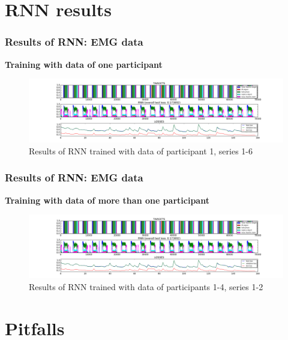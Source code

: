 \documentclass{beamer}
\begin{document}
\section{RNN results}		

\begin{frame}
	\frametitle{Results of RNN: EMG data}
	\textbf{Training with data of one participant}
	\begin{figure}[ht]
		\centering
		\includegraphics[width=1.0\textwidth,trim={5cm 0cm 5cm 0cm},clip]{images/EMG-results_participant_1_series1-6.png}
		\caption{Results of RNN trained with data of participant 1, series 1-6}
	\end{figure}
\end{frame}

\begin{frame}
	\frametitle{Results of RNN: EMG data}
	\textbf{Training with data of more than one participant}
	\begin{figure}[ht]
		\centering
		\includegraphics[width=1.0\textwidth,trim={5cm 0cm 5cm 0cm},clip]{images/EMG-results_participant_1-4_series1-2.png}
		\caption{Results of RNN trained with data of participants 1-4, series 1-2}

	\end{figure}
\end{frame}

\section{Pitfalls}
\end{document}
